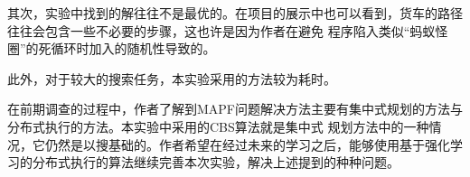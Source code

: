 \documentclass[UTF8]{ctexart}  %
\begin{document}
其次，实验中找到的解往往不是最优的。在项目的展示中也可以看到，货车的路径往往会包含一些不必要的步骤，这也许是因为作者在避免
程序陷入类似“蚂蚁怪圈”的死循环时加入的随机性导致的。

此外，对于较大的搜索任务，本实验采用的方法较为耗时。

在前期调查的过程中，作者了解到MAPF问题解决方法主要有集中式规划的方法与分布式执行的方法。本实验中采用的CBS算法就是集中式
规划方法中的一种情况，它仍然是以搜基础的。作者希望在经过未来的学习之后，能够使用基于强化学习的分布式执行的算法继续完善本次实验，解决上述提到的种种问题。



\end{document}
